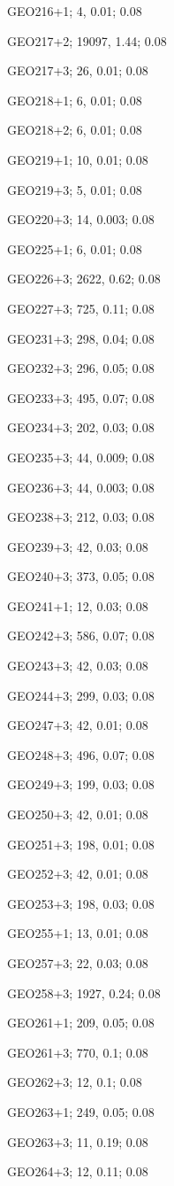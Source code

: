 GEO216+1; 4, 0.01; 0.08

GEO217+2; 19097, 1.44; 0.08

GEO217+3; 26, 0.01; 0.08

GEO218+1; 6, 0.01; 0.08

GEO218+2; 6, 0.01; 0.08

GEO219+1; 10, 0.01; 0.08

GEO219+3; 5, 0.01; 0.08

GEO220+3; 14, 0.003; 0.08

GEO225+1; 6, 0.01; 0.08

GEO226+3; 2622, 0.62; 0.08

GEO227+3; 725, 0.11; 0.08

GEO231+3; 298, 0.04; 0.08

GEO232+3; 296, 0.05; 0.08

GEO233+3; 495, 0.07; 0.08

GEO234+3; 202, 0.03; 0.08

GEO235+3; 44, 0.009; 0.08

GEO236+3; 44, 0.003; 0.08

GEO238+3; 212, 0.03; 0.08

GEO239+3; 42, 0.03; 0.08

GEO240+3; 373, 0.05; 0.08

GEO241+1; 12, 0.03; 0.08

GEO242+3; 586, 0.07; 0.08

GEO243+3; 42, 0.03; 0.08

GEO244+3; 299, 0.03; 0.08

GEO247+3; 42, 0.01; 0.08

GEO248+3; 496, 0.07; 0.08

GEO249+3; 199, 0.03; 0.08

GEO250+3; 42, 0.01; 0.08

GEO251+3; 198, 0.01; 0.08

GEO252+3; 42, 0.01; 0.08

GEO253+3; 198, 0.03; 0.08

GEO255+1; 13, 0.01; 0.08

GEO257+3; 22, 0.03; 0.08

GEO258+3; 1927, 0.24; 0.08

GEO261+1; 209, 0.05; 0.08

GEO261+3; 770, 0.1; 0.08

GEO262+3; 12, 0.1; 0.08

GEO263+1; 249, 0.05; 0.08

GEO263+3; 11, 0.19; 0.08

GEO264+3; 12, 0.11; 0.08


